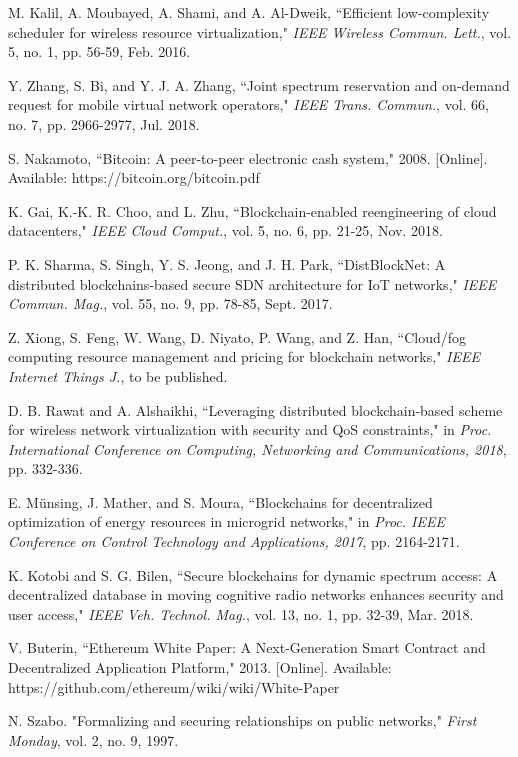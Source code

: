 \documentclass[journal]{IEEEtran}
\begin{document}
\begin{thebibliography}{1}
 M. Kalil, A. Moubayed, A. Shami, and A. Al-Dweik, ``Efficient low-complexity scheduler for wireless resource virtualization," \emph{IEEE Wireless Commun. Lett.}, vol. 5, no. 1, pp. 56-59, Feb. 2016.
	
 Y. Zhang, S. Bi, and Y. J. A. Zhang, ``Joint spectrum reservation and on-demand request for mobile virtual network operators," \emph{IEEE Trans. Commun.}, vol. 66, no. 7, pp. 2966-2977, Jul. 2018.

 S. Nakamoto, ``Bitcoin: A peer-to-peer electronic cash system," 2008. [Online]. Available: https://bitcoin.org/bitcoin.pdf

 K. Gai, K.-K. R. Choo, and L. Zhu, ``Blockchain-enabled reengineering of cloud datacenters," \emph{IEEE Cloud Comput.}, vol. 5, no. 6, pp. 21-25, Nov. 2018.

 P. K. Sharma, S. Singh, Y. S. Jeong, and J. H. Park, ``DistBlockNet: A distributed blockchains-based secure SDN architecture for IoT networks," \emph{IEEE Commun. Mag.}, vol. 55, no. 9, pp. 78-85, Sept. 2017.

 Z. Xiong, S. Feng, W. Wang, D. Niyato, P. Wang, and Z. Han, ``Cloud/fog computing resource management and pricing for blockchain networks," \emph{IEEE Internet Things J.}, to be published.

 D. B. Rawat and A. Alshaikhi, ``Leveraging distributed blockchain-based scheme for wireless network virtualization with security and QoS constraints," in \emph{Proc. International Conference on Computing, Networking and Communications, 2018}, pp. 332-336.

 E. M\"{u}nsing, J. Mather, and S. Moura, ``Blockchains for decentralized optimization of energy resources in microgrid networks," in \emph{Proc. IEEE Conference on Control Technology and Applications, 2017}, pp. 2164-2171.

 K. Kotobi and S. G. Bilen, ``Secure blockchains for dynamic spectrum access: A decentralized database in moving cognitive radio networks enhances security and user access," \emph{IEEE Veh. Technol. Mag.}, vol. 13, no. 1, pp. 32-39, Mar. 2018.
{
	\color{red}
	
	 V. Buterin, ``Ethereum White Paper: A Next-Generation Smart Contract and Decentralized Application Platform," 2013. [Online]. Available: https://github.com/ethereum/wiki/wiki/White-Paper
	
	 N. Szabo. "Formalizing and securing relationships on public networks," \emph{First Monday}, vol. 2, no. 9, 1997.
	
}
\end{thebibliography}
\end{document}
